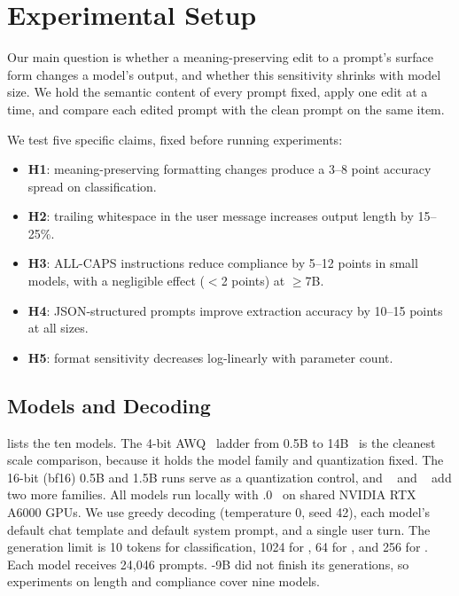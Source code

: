 \section{Experimental Setup}
\label{sec:method}

Our main question is whether a meaning-preserving edit to a prompt's surface form changes a model's output, and whether this sensitivity shrinks with model size. We hold the semantic content of every prompt fixed, apply one edit at a time, and compare each edited prompt with the clean  prompt on the same item.

 We test five specific claims, fixed before running experiments:
\begin{itemize}[leftmargin=*,itemsep=0pt,topsep=0pt]
    \item {\bf H1}: meaning-preserving formatting changes produce a 3--8 point accuracy spread on classification.
    \item {\bf H2}: trailing whitespace in the user message increases output length by 15--25\%.
    \item {\bf H3}: ALL-CAPS instructions reduce compliance by 5--12 points in small models, with a negligible effect ($<$2 points) at $\geq$7B.
    \item {\bf H4}: JSON-structured prompts improve extraction accuracy by 10--15 points at all sizes.
    \item {\bf H5}: format sensitivity decreases log-linearly with parameter count.
\end{itemize}

\subsection{Models and Decoding}

 lists the ten models. The 4-bit AWQ~\cite{lin2024awq} \qwen ladder from 0.5B to 14B~\cite{qwen2024qwen25} is the cleanest scale comparison, because it holds the model family and quantization fixed. The 16-bit (bf16) 0.5B and 1.5B runs serve as a quantization control, and \llama~\cite{grattafiori2024llama} and \gemma~\cite{gemma2024gemma2} add two more families. All models run locally with .0~\cite{kwon2023efficient} on shared NVIDIA RTX A6000 GPUs. We use greedy decoding (temperature 0, seed 42), each model's default chat template and default system prompt, and a single user turn. The generation limit is 10 tokens for classification, 1024 for \ifeval, 64 for \squad, and 256 for \conll. Each model receives 24{,}046 prompts. \gemma-9B did not finish its \ifeval generations, so experiments on length and compliance cover nine models.

